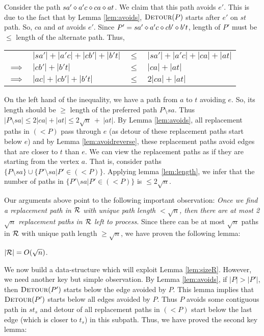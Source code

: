 \noindent Consider the path $sa' \diamond a'c \diamond ca \diamond at$. We claim that this path avoids $e'$. This is due to the fact that by Lemma \ref{lem:avoids}, $\textsc{Detour}(P)$
starts after $e'$ on $st$ path. So, $ca$ and $at$ avoids $e'$. Since $P' = sa' \diamond a'c \diamond cb' \diamond b't$, length of $P'$ must be $\le$ length of the alternate path. Thus,\\
\begin{tabular}{llll}
 & $|sa'| +  |a'c|
+ |cb'| + |b't|$  & $\le$ &$|sa'| + |a'c| + |ca|  + |at|$\\
$\implies$& $
|cb'| + |b't|$ & $\le$ & $|ca|  + |at|$   \\
$\implies$& $|ac| +
|cb'| + |b't|$ & $\le$ &   $2|ca|  + |at|$

\end{tabular}

On the left hand of the inequality, we  have a path from $a$ to $t$ avoiding $e$. So, its length should be $\ge$ length of the preferred path $P \setminus sa$. Thus $|P \setminus sa| \le  2|ca|  + |at| \le 2\sqrt n\
+\ |at|$. By Lemma \ref{lem:avoids},
all  replacement paths in $(<P)$ pass through $e$ (as
detour of these replacement paths start below $e$) and by
Lemma \ref{lem:avoidreverse}, these replacement paths avoid
edges that are closer to $t$ than $e$. We can view the
replacement paths as if they are starting from the vertex $a$.
That is, consider  paths $\{P\setminus sa\} \cup \{ P'\setminus
sa | P' \in (<P)\}$. Applying lemma \ref{lem:length}, we infer that the number of
paths in $\{ P'\setminus
sa | P' \in (<P)\}$ is $\le 2 \sqrt n$.


Our arguments above point to the following important observation: {\em Once we find a replacement path in $\mathcal{R}$ with unique path length $< \sqrt n$, then there are at most 2$\sqrt n$ replacement paths in $\mathcal{R}$ left to process.}
Since there can be at most $\sqrt n$ paths in $\mathcal{R}$ with unique path length $\ge \sqrt n$, we have proven the following lemma:

\begin{lemma}
\label{lem:sizeR}
$|\mathcal{R}| = O(\sqrt n)$.
\end{lemma}

We now build a data-structure which will exploit Lemma \ref{lem:sizeR}.
However, we need another key but simple observation. By Lemma \ref{lem:avoids}, if $|P| > |P'|$, then $\textsc{Detour}(P')$ starts below the edge avoided by $P$. This lemma implies that $\textsc{Detour}(P')$ starts below all  edges avoided by $P$. Thus $P$ avoids some contiguous path in $st_s$ and detour of all replacement paths in $(<P)$ start below the last edge (which is closer to $t_s$) in this subpath. Thus, we have proved the second key lemma:

